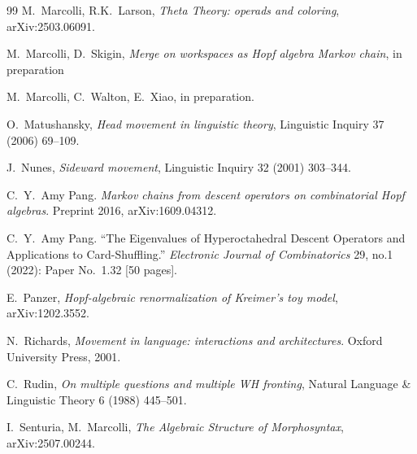 \documentclass[12pt]{amsart}
\numberwithin{equation}{section}
\begin{document}
\begin{thebibliography}{99}
 M.~Marcolli, R.K.~Larson, {\em Theta Theory: operads and coloring}, arXiv:2503.06091.

 M.~Marcolli, D.~Skigin, {\em Merge on workspaces as Hopf algebra Markov chain}, in preparation

 M.~Marcolli, C.~Walton, E.~Xiao, %
in preparation. 

 O.~Matushansky, {\em Head movement in linguistic theory}, Linguistic Inquiry 37 (2006) 69--109.

 J.~Nunes,  {\em Sideward movement}, Linguistic Inquiry 32 (2001) 303--344.

 C.~Y.~Amy Pang. {\em  Markov chains from descent operators on combinatorial Hopf algebras}. 
Preprint 2016, arXiv:1609.04312.

 C.~Y.~Amy Pang. ``The Eigenvalues of Hyperoctahedral 
Descent Operators and Applications to Card-Shuffling.”
{\em Electronic Journal of Combinatorics} 29, no.1 (2022): 
Paper No.~1.32 [50 pages].


 E.~Panzer, {\em Hopf-algebraic renormalization of Kreimer's toy model}, arXiv:1202.3552. 

 N.~Richards, 
{\em Movement in language: interactions and architectures}. 
Oxford University Press, 2001.


 C.~Rudin, 
{\em On multiple questions and multiple WH fronting}, Natural Language \& Linguistic Theory 6 (1988) 445--501.

 I.~Senturia, M.~Marcolli, {\em The Algebraic Structure of Morphosyntax}, arXiv:2507.00244. 

\end{thebibliography}
\end{document}
